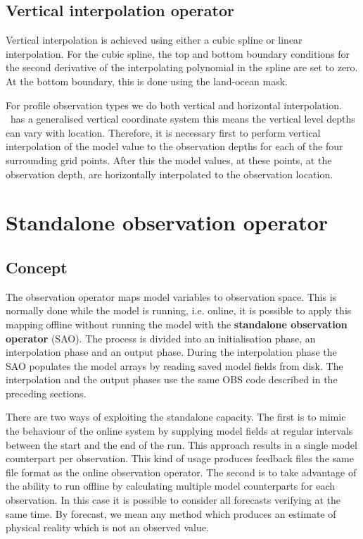 \documentclass[../main/NEMO_manual]{subfiles}
\begin{document}
\subsection{Vertical interpolation operator}

Vertical interpolation is achieved using either a cubic spline or linear interpolation.
For the cubic spline, the top and bottom boundary conditions for the second derivative of
the interpolating polynomial in the spline are set to zero.
At the bottom boundary, this is done using the land-ocean mask.

For profile observation types we do both vertical and horizontal interpolation. \NEMO\ has a generalised vertical coordinate system this means the vertical level depths can vary with location. Therefore, it is necessary first to perform vertical interpolation of the model value to the observation depths for each of the four surrounding grid points. After this the model values, at these points, at the observation depth, are horizontally interpolated to the observation location.


\section{Standalone observation operator}
\label{sec:OBS_sao}

\subsection{Concept}

The observation operator maps model variables to observation space. This is normally done while the model is running, i.e. online, it is possible to apply this mapping offline without running the model with the \textbf{standalone observation operator} (SAO). The process is divided into an initialisation phase, an interpolation phase and an output phase.
During the interpolation phase the SAO populates the model arrays by
reading saved model fields from disk. The interpolation and the output phases use the same OBS code described in the preceding sections.

There are two ways of exploiting the standalone capacity.
The first is to mimic the behaviour of the online system by supplying model fields at
regular intervals between the start and the end of the run.
This approach results in a single model counterpart per observation.
This kind of usage produces feedback files the same file format as the online observation operator.
The second is to take advantage of the ability to run offline by calculating
multiple model counterparts for each observation.
In this case it is possible to consider all forecasts verifying at the same time.
By forecast, we mean any method which produces an estimate of physical reality which is not an observed value.
\end{document}

